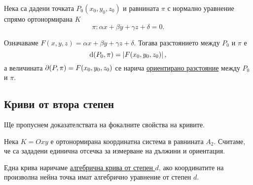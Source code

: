 \documentclass[numbers=endperiod, DIV=15]{scrartcl}
\begin{document}
\begin{theorem}
  Нека са дадени точката $P_0(x_0, y_0, z_0)$ и равнината $\pi$ с нормално уравнение спрямо ортонормирана $K$
  \begin{displaymath}
    \pi: \alpha x + \beta y + \gamma z + \delta = 0.
  \end{displaymath}

  Означаваме $F(x, y, z) = \alpha x + \beta y + \gamma z + \delta$. Тогава разстоянието между $P_0$ и $\pi$ е
  \begin{displaymath}
    \operatorname{d}(P_0, \pi) = \left\vert F(x_0, y_0, z_0) \right\vert,
  \end{displaymath}
  а величината $\partial(P, \pi) = F(x_0, y_0, z_0)$ се нарича \underline{ориентирано разстояние} между $P_0$ и $\pi$.
\end{theorem}

\subsection{Криви от втора степен}

\begin{note}
  Ще пропуснем доказателствата на фокалните свойства на кривите.
\end{note}

Нека $K = Oxy$ е ортонормирана координатна система в равнината $A_2$. Считаме, че са зададени единична отсечка за измерване на дължини и ориентация.

\begin{definition}
  Една крива наричаме \underline{алгебрична крива от степен $d$}, ако координатите на произволна нейна точка имат алгебрично уравнение от степен $d$.
\end{definition}
\end{document}
